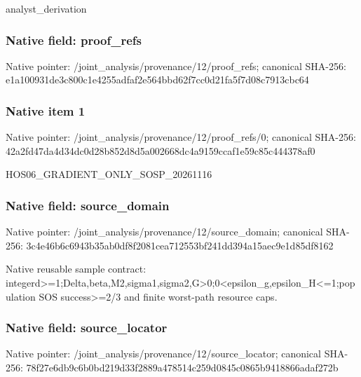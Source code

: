 \documentclass[10pt,a4paper]{article}
\begin{document}
\begingroup\raggedright\sloppy analyst\_\allowbreak{}derivation\par\endgroup

\subsubsection{Native field: proof\_\allowbreak{}refs}
Native pointer: /joint\_\allowbreak{}analysis/provenance/12/proof\_\allowbreak{}refs; canonical SHA-256: e1a100931de3c800c1e4255adfaf2e564bbd62f7cc0d21fa5f7d08c7913cbc64

\subsubsection{Native item 1}
Native pointer: /joint\_\allowbreak{}analysis/provenance/12/proof\_\allowbreak{}refs/0; canonical SHA-256: 42a2fd47da4d34dc0d28b852d8d5a002668dc4a9159ccaf1e59c85c444378af0

\begingroup\raggedright\sloppy HOS06\_\allowbreak{}GRADIENT\_\allowbreak{}ONLY\_\allowbreak{}SOSP\_\allowbreak{}20261116\par\endgroup

\subsubsection{Native field: source\_\allowbreak{}domain}
Native pointer: /joint\_\allowbreak{}analysis/provenance/12/source\_\allowbreak{}domain; canonical SHA-256: 3c4e46b6c6943b35ab0df8f2081cea712553bf241dd394a15aec9e1d85df8162

\begingroup\raggedright\sloppy Native reusable sample contract:\allowbreak{} integerd>=\allowbreak{}1;\allowbreak{}Delta,\allowbreak{}beta,\allowbreak{}M2,\allowbreak{}sigma1,\allowbreak{}sigma2,\allowbreak{}G>0;\allowbreak{}0<epsilon\_\allowbreak{}g,\allowbreak{}epsilon\_\allowbreak{}H<=\allowbreak{}1;\allowbreak{}population SOS success>=\allowbreak{}2/\allowbreak{}3 and finite worst-path resource caps.\par\endgroup

\subsubsection{Native field: source\_\allowbreak{}locator}
Native pointer: /joint\_\allowbreak{}analysis/provenance/12/source\_\allowbreak{}locator; canonical SHA-256: 78f27e6db9c6b0bd219d33f2889a478514c259d0845c0865b9418866adaf272b
\end{document}
